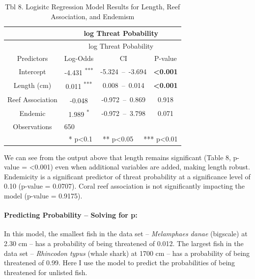 \documentclass[
  letterpaper,
  DIV=11,
  numbers=noendperiod]{scrartcl}
\let\oldparagraph\paragraph
\renewcommand{\paragraph}[1]{\oldparagraph{#1}\mbox{}}
\begin{document}
\begin{longtable}[]{@{}cccc@{}}
\caption{Tbl 8. Logisitc Regression Model Results for Length, Reef
Association, and Endemism}\tabularnewline
\toprule()
~ & \multicolumn{3}{c}{log Threat Pobability} \\
\midrule()
\endfirsthead
\toprule()
~ & \multicolumn{3}{c}{log Threat Pobability} \\
\midrule()
\endhead
Predictors & Log-Odds & CI & P-value \\
Intercept & -4.431 \textsuperscript{***} & -5.324~--~-3.694 &
\textbf{\textless0.001} \\
Length (cm) & 0.011 \textsuperscript{***} & 0.008~--~0.014 &
\textbf{\textless0.001} \\
Reef Association & -0.048 \textsuperscript{} & -0.972~--~0.869 &
0.918 \\
Endemic & 1.989 \textsuperscript{*} & -0.972~--~3.798 & 0.071 \\
Observations & \multicolumn{3}{l}{650} \\
\multicolumn{4}{r}{* p\textless0.1~~~** p\textless0.05~~~***
p\textless0.01} \\
\bottomrule()
\end{longtable}

We can see from the output above that length remains significant (Table
8, p-value = \textless0.001) even when additional variables are added,
making length robust. Endemicity is a significant predictor of threat
probability at a significance level of 0.10 (p-value = 0.0707). Coral
reef association is not significantly impacting the model (p-value =
0.9175).

\hypertarget{predicting-probability-solving-for-p}{%
\paragraph{Predicting Probability -- Solving for
p:}\label{predicting-probability-solving-for-p}}

In this model, the smallest fish in the data set -- \emph{Melamphaes
danae} (bigscale) at 2.30 cm -- has a probability of being threatened of
0.012. The largest fish in the data set -- \emph{Rhincodon typus} (whale
shark) at 1700 cm -- has a probability of being threatened of 0.99. Here
I use the model to predict the probabilities of being threatened for
unlisted fish.
\end{document}
